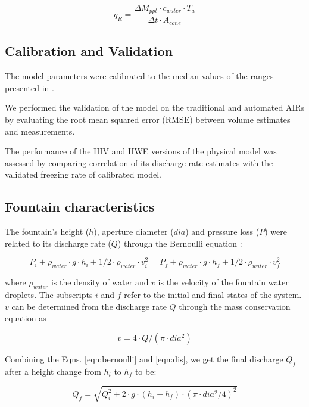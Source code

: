 \documentclass[tc, manuscript]{copernicus}
\begin{document}
\begin{equation}
  q_{R} = \frac{\Delta M_{ppt} \cdot c_{water} \cdot T_{a}}{\Delta t \cdot A_{cone}}
\end{equation}

\subsection{Calibration and Validation}

The model parameters were calibrated to the median values of the ranges presented in
\cite{balasubramanianInfluenceMeteorologicalConditions2022}.

We performed the validation of the model on the traditional and automated AIRs by evaluating the root mean
squared error (RMSE) between volume estimates and measurements. 

The performance of the HIV and HWE versions of the physical model was assessed by comparing correlation of its
discharge rate estimates with the validated freezing rate of calibrated model.

\subsection{Fountain characteristics}

The fountain's height ($h$), aperture diameter ($dia$) and pressure loss ($P$) were related to its discharge
rate ($Q$) through the Bernoulli equation :

\begin{equation}
  \label{eqn:bernoulli}
  P_{i} + \rho_{water} \cdot g \cdot h_{i} + 1/2 \cdot \rho_{water} \cdot v_{i}^2 = P_{f} + \rho_{water} \cdot g
  \cdot h_{f} + 1/2 \cdot \rho_{water} \cdot v_{f}^2
\end{equation}

where $\rho_{water}$ is the density of water and $v$ is the velocity of the fountain water droplets. The
subscripts $i$ and $f$ refer to the initial and final states of the system. $v$ can be determined from the
discharge rate $Q$ through the mass conservation equation as 

\begin{equation}
	\label{eqn:dis}
 v = 4 \cdot Q/(\pi \cdot dia^2)
\end{equation}

Combining the Eqns. \ref{eqn:bernoulli} and \ref{eqn:dis}, we get the final discharge $Q_f$ after a height change
from $h_i$ to $h_f$ to be:

\begin{equation}
  \label{eqn:discharge}
  Q_f = \sqrt{Q_i^2 + 2 \cdot g \cdot (h_i-h_f) \cdot (\pi \cdot dia^2/4)^2}
\end{equation}
\end{document}
